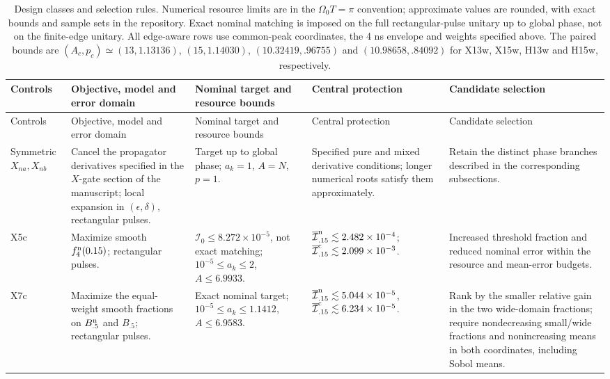 {\footnotesize
\setlength{\tabcolsep}{3pt}
\renewcommand{\arraystretch}{1.12}
\begin{longtable}{>{\raggedright\arraybackslash}p{1.9cm}>{\raggedright\arraybackslash}p{5.6cm}>{\raggedright\arraybackslash}p{5.3cm}>{\raggedright\arraybackslash}p{4.7cm}>{\raggedright\arraybackslash}p{7.4cm}}
\caption{Design classes and selection rules. Numerical resource limits are in the $\Omega_0T=\pi$ convention; approximate values are rounded, with exact bounds and sample sets in the repository. Exact nominal matching is imposed on the full rectangular-pulse unitary up to global phase, not on the finite-edge unitary. All edge-aware rows use common-peak coordinates, the 4 ns envelope and weights specified above. The paired bounds are $(A_c,p_c)\simeq(13,1.13136)$, $(15,1.14030)$, $(10.32419,.96755)$ and $(10.98658,.84092)$ for X13w, X15w, H13w and H15w, respectively.}\label{table:design_methods}\\
\hline
Controls & Objective, model and error domain & Nominal target and resource bounds & Central protection & Candidate selection \\
\hline\endfirsthead
Controls & Objective, model and error domain & Nominal target and resource bounds & Central protection & Candidate selection \\
\hline\endhead
\hline\endfoot
Symmetric $X_{na},X_{nb}$ & Cancel the propagator derivatives specified in the $X$-gate section of the manuscript; local expansion in $(\epsilon,\delta)$, rectangular pulses. & Target up to global phase; $a_k=1$, $A=N$, $p=1$. & Specified pure and mixed derivative conditions; longer numerical roots satisfy them approximately. & Retain the distinct phase branches described in the corresponding subsections. \\[2pt]
X5c & Maximize smooth $f_4^{\rm n}(0.15)$; rectangular pulses. & $\mathcal I_0\leq8.272\times10^{-5}$, not exact matching; $10^{-5}\leq a_k\leq2$, $A\leq6.9933$. & $\overline{\mathcal I}^{\rm n}_{.15}\lesssim2.482\times10^{-4}$; $\overline{\mathcal I}^{\rm c}_{.15}\lesssim2.099\times10^{-3}$. & Increased threshold fraction and reduced nominal error within the resource and mean-error budgets. \\[2pt]
X7c & Maximize the equal-weight smooth fractions on $B_{.5}^{\rm n}$ and $B_{.5}$; rectangular pulses. & Exact nominal target; $10^{-5}\leq a_k\leq1.1412$, $A\leq6.9583$. & $\overline{\mathcal I}^{\rm n}_{.15}\lesssim5.044\times10^{-5}$, $\overline{\mathcal I}^{\rm c}_{.15}\lesssim6.234\times10^{-5}$. & Rank by the smaller relative gain in the two wide-domain fractions; require nondecreasing small/wide fractions and nonincreasing means in both coordinates, including Sobol means. \\[2pt]

\end{longtable}}
